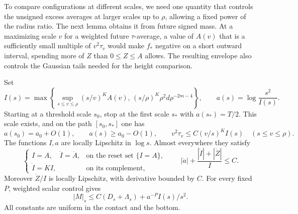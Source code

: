 To compare configurations at different scales, we need one quantity
that controls the unsigned excess averages at larger scales up to
\(\rho\), allowing a fixed power of the radius ratio.
The next lemma obtains it from future signed mass. At a maximizing
scale \(v\) for a weighted future \(\tau\)-average, a value of \(A(v)\)
that is a sufficiently small multiple of \(v^2\tau_v\) would make
\(f_*\) negative on a short outward interval, spending more of \(Z\)
than \(0\le Z\le A\) allows. The resulting envelope also controls
the Gaussian tails needed for the height comparison.

\begin{lemma}
\label{ex:envelope}
Set
\begin{equation}
 I(s)=\max\left\{
   \sup_{s\le v\le\rho}(s/v)^K A(v),\,
   (s/\rho)^K\rho^2d\rho^{-2m-4}\right\},
 \qquad a(s)=\log\frac{s^2}{I(s)}.
 \label{ex:future}
\end{equation}
Starting at a threshold scale \(s_0\), stop at the first scale
\(s_*\) with \(a(s_*)=T/2\). This scale exists, and on the path
\([s_0,s_*]\) one has
\begin{equation}
 a(s_0)=a_0+O(1),\qquad a(s)\ge a_0-O(1),\qquad
 v^2\tau_v\le C(v/s)^K I(s)\quad(s\le v\le\rho).
 \label{ex:dilations}
\end{equation}
The functions \(I,a\) are locally Lipschitz in \(\log s\). Almost
everywhere they satisfy
\begin{equation}
 \begin{cases}
 I=A,\quad \dot I=\dot A,&\text{on the reset set }\{I=A\},\\
 \dot I=KI,&\text{on its complement},
 \end{cases}
 \qquad
 |\dot a|+\dfrac{|\dot I|+|\dot Z|}{I}\le C.
 \label{ex:derivatives}
\end{equation}
Moreover \(\dot Z/I\) is locally Lipschitz, with derivative bounded
by \(C\). For every fixed \(P\), weighted scalar control gives
\begin{equation}
 |M|_s\le C(D_s+\Lambda_s)+a^{-P}I(s)/s^2.
 \label{ex:weighted-scalar}
\end{equation}
All constants are uniform in the contact and the bottom.
\end{lemma}

